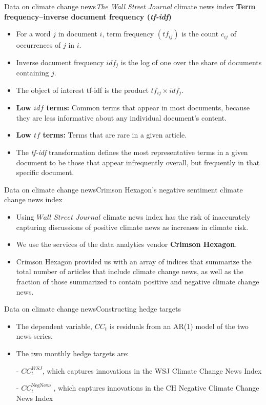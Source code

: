 \begin{frame}{Data on climate change news}{\textit{The Wall Street Journal} climate news index}
	\textbf{Term frequency–inverse document frequency (\textit{tf-idf})}
	\begin{itemize}		
		\item For a word $j$ in document $i$, term frequency $\left(t f_{i j}\right)$ is the count $c_{i j}$ of occurrences of $j$ in $i$. 
		\item Inverse document frequency $i d f_{j}$ is the log of one over the share of documents containing $j$. 
		\item The object of interest tf-idf is the product $t f_{i j} \times i d f_{j}$. 
		\item \textbf{Low $idf$ terms:} Common terms that appear in most documents, because they are less informative about any individual document’s content. 
		\item \textbf{Low $tf$ terms:} Terms that are rare in a given article.
		\item The \textit{tf-idf} transformation defines the most representative terms in a given document to be those that appear infrequently overall, but frequently in that specific document.
	\end{itemize}	
\end{frame}

\begin{frame}{Data on climate change news}{Crimson Hexagon’s negative sentiment climate change news index}
	\begin{itemize}		
		\item Using $Wall$ $Street$ $Journal$ climate news index has the risk of inaccurately capturing discussions of positive climate news as 		increases in climate risk.
		\item We use the services of the data analytics vendor \textbf{Crimson Hexagon}.
		\item Crimson Hexagon provided us with an array of indices that summarize the total number of articles that include climate change news, as well as the fraction of those summarized to contain positive and negative climate change news.
	\end{itemize}	
\end{frame}

\begin{frame}{Data on climate change news}{Constructing hedge targets}
 	\begin{itemize}		
 	\item The dependent variable, $C C_{t}$ is residuals from an AR(1) model of the two news series. 
 	\item The two monthly hedge targets are: 
 	\item [-] $C C_{t}^{W S J}$, which captures innovations in the WSJ Climate Change News Index
 	\item [-] $C C_{t}^{\text {NegNews }}$, which captures innovations in the CH Negative Climate Change News Index
 \end{itemize}
\end{frame}


